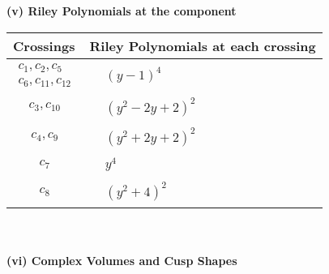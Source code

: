 \documentclass[1p]{elsarticle_modified}
\theoremstyle{definition}
\begin{document}
\newpage\renewcommand{\arraystretch}{1}
\flushleft \textbf{(v) Riley Polynomials at the component}\newline \\
\begin{tabular}{m{50pt}|m{274pt}}
Crossings & \hspace{64pt}Riley Polynomials at each crossing \\
\hline $$\begin{aligned}c_{1},c_{2},c_{5}\\c_{6},c_{11},c_{12}\end{aligned}$$&$\begin{aligned}
&(y-1)^4
\end{aligned}$\\
\hline $$\begin{aligned}c_{3},c_{10}\end{aligned}$$&$\begin{aligned}
&(y^2-2 y+2)^2
\end{aligned}$\\
\hline $$\begin{aligned}c_{4},c_{9}\end{aligned}$$&$\begin{aligned}
&(y^2+2 y+2)^2
\end{aligned}$\\
\hline $$\begin{aligned}c_{7}\end{aligned}$$&$\begin{aligned}
&y^4
\end{aligned}$\\
\hline $$\begin{aligned}c_{8}\end{aligned}$$&$\begin{aligned}
&(y^2+4)^2
\end{aligned}$\\
\hline
\end{tabular}\\~\\
\newpage\flushleft \textbf{(vi) Complex Volumes and Cusp Shapes}
\end{document}
